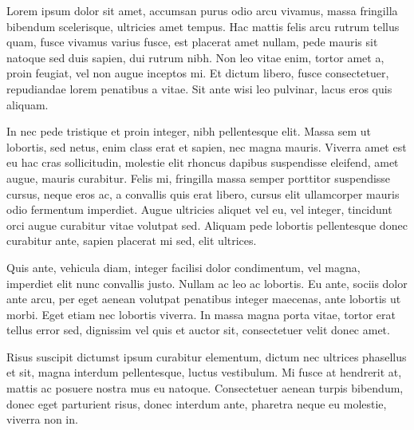 \documentclass{TMR}
\begin{document}
\begin{coverletter}

Lorem ipsum dolor sit amet, accumsan purus odio arcu vivamus, massa fringilla bibendum scelerisque, ultricies amet tempus. Hac mattis felis arcu rutrum tellus quam, fusce vivamus varius fusce, est placerat amet nullam, pede mauris sit natoque sed duis sapien, dui rutrum nibh. Non leo vitae enim, tortor amet a, proin feugiat, vel non augue inceptos mi. Et dictum libero, fusce consectetuer, repudiandae lorem penatibus a vitae. Sit ante wisi leo pulvinar, lacus eros quis aliquam. 

In nec pede tristique et proin integer, nibh pellentesque elit. Massa sem ut lobortis, sed netus, enim class erat et sapien, nec magna mauris. Viverra amet est eu hac cras sollicitudin, molestie elit rhoncus dapibus suspendisse eleifend, amet augue, mauris curabitur. Felis mi, fringilla massa semper porttitor suspendisse cursus, neque eros ac, a convallis quis erat libero, cursus elit ullamcorper mauris odio fermentum imperdiet. Augue ultricies aliquet vel eu, vel integer, tincidunt orci augue curabitur vitae volutpat sed. Aliquam pede lobortis pellentesque donec curabitur ante, sapien placerat mi sed, elit ultrices.

Quis ante, vehicula diam, integer facilisi dolor condimentum, vel magna, imperdiet elit nunc convallis justo. Nullam ac leo ac lobortis. Eu ante, sociis dolor ante arcu, per eget aenean volutpat penatibus integer maecenas, ante lobortis ut morbi. Eget etiam nec lobortis viverra. In massa magna porta vitae, tortor erat tellus error sed, dignissim vel quis et auctor sit, consectetuer velit donec amet. 

Risus suscipit dictumst ipsum curabitur elementum, dictum nec ultrices phasellus et sit, magna interdum pellentesque, luctus vestibulum. Mi fusce at hendrerit at, mattis ac posuere nostra mus eu natoque. Consectetuer aenean turpis bibendum, donec eget parturient risus, donec interdum ante, pharetra neque eu molestie, viverra non in.

\end{coverletter}
\end{document}
